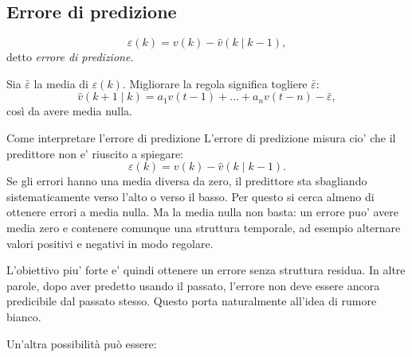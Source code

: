 \documentclass[11pt,a4paper]{article}
\begin{document}
\subsection{Errore di predizione}
\[
\varepsilon(k)=v(k)-\hat v(k\mid k-1),
\]
detto \emph{errore di predizione}.

\begin{center}
\end{center}

Sia $\bar\varepsilon$ la media di $\varepsilon(k)$. Migliorare la regola significa togliere $\bar\varepsilon$:
\[
\hat v(k+1\mid k)=a_1 v(t-1)+\dots+a_n v(t-n)-\bar\varepsilon,
\]
così da avere media nulla.

\begin{spiegazione}{Come interpretare l'errore di predizione}
L'errore di predizione misura cio' che il predittore non e' riuscito a spiegare:
\[
\varepsilon(k)=v(k)-\hat v(k\mid k-1).
\]
Se gli errori hanno una media diversa da zero, il predittore sta sbagliando sistematicamente verso l'alto o verso il basso. Per questo si cerca almeno di ottenere errori a media nulla. Ma la media nulla non basta: un errore puo' avere media zero e contenere comunque una struttura temporale, ad esempio alternare valori positivi e negativi in modo regolare.

L'obiettivo piu' forte e' quindi ottenere un errore senza struttura residua. In altre parole, dopo aver predetto usando il passato, l'errore non deve essere ancora predicibile dal passato stesso. Questo porta naturalmente all'idea di rumore bianco.
\end{spiegazione}


Un'altra possibilità può essere:

\begin{center}
\end{center}
\end{document}
